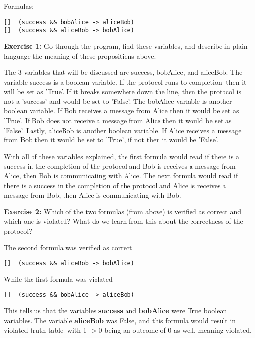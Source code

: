 \documentclass{article}
\theoremstyle{theorem}
\theoremstyle{definition}
\theoremstyle{remark}
\begin{document}
\noindent\newline Formulas:
\begin{verbatim}
[]  (success && bobAlice -> aliceBob)
[]  (success && aliceBob -> bobAlice)
\end{verbatim}


\noindent\newline\textbf{Exercise 1:} 
Go through the program, find these variables, and describe in plain language the meaning of these propositions above.

\noindent\newline The 3 variables that will be discussed are success, bobAlice, and aliceBob. The variable success is a boolean variable. If the protocol runs to completion, then it will be set as 'True'. If it breaks somewhere down the line, then the protocol is not a 'success' and would be set to 'False'. The bobAlice variable is another boolean variable. If Bob receives a message from Alice then it would be set as 'True'. If Bob does not receive a message from Alice then it would be set as 'False'. Lastly, aliceBob is another boolean variable. If Alice receives a message from Bob then it would be set to 'True', if not then it would be 'False'.

\noindent\newline With all of these variables explained, the first formula would read if there is a success in the completion of the protocol and Bob is receives a message from Alice, then Bob is communicating with Alice. The next formula would read if there is a success in the completion of the protocol and Alice is receives a message from Bob, then Alice is communicating with Bob.


\noindent\newline\textbf{Exercise 2:} 
Which of the two formulas (from above) is verified as correct and which one is violated? What do we learn from this about the correctness of the protocol?

The second formula was verified as correct
\begin{verbatim}
[]  (success && aliceBob -> bobAlice)
\end{verbatim}

\noindent\newline While the first formula was violated
\begin{verbatim}
[]  (success && bobAlice -> aliceBob)
\end{verbatim}


\noindent\newline\newline This tells us that the variables \textbf{success} and \textbf{bobAlice} were True boolean variables. The variable \textbf{aliceBob} was False, and this formula would result in violated truth table, with 1 -> 0 being an outcome of 0 as well, meaning violated.
\end{document}
